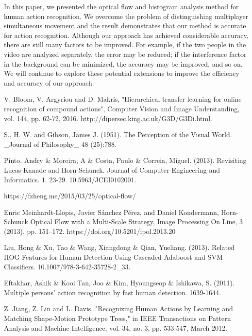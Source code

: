 \documentclass[runningheads,a4paper]{llncs}
\begin{document}
	In this paper, we presented the optical flow and histogram analysis method for human action recognition. We overcome the problem of distinguishing multiplayer simultaneous movement and the result demonstrates that our method is accurate for action recognition. Although our approach has achieved considerable accuracy, there are still many factors to be improved. For example, if the two people in the video are analyzed separately, the error may be reduced; if the interference factor in the background can be minimized, the accuracy may be improved, and so on. We will continue to explore these potential extensions to improve the efficiency and accuracy of our approach.


\begin{thebibliography}{4}

 V. Bloom, V. Argyriou and D. Makris, "Hierarchical transfer learning for online recognition of compound actions", Computer Vision and Image Understanding, vol. 144, pp. 62-72, 2016. http://dipersec.king.ac.uk/G3D/G3Di.html.

 S., H. W. and Gibson, James J. (1951). The Perception of the Visual World. \_Journal of Philosophy\_ 48 (25):788.

 Pinto, Andry \& Moreira, A \& Costa, Paulo \& Correia, Miguel. (2013). Revisiting Lucas-Kanade and Horn-Schunck. Journal of Computer Engineering and Informatics. 1. 23-29. 10.5963/JCEI0102001. 

 https://fzheng.me/2015/03/25/optical-flow/

 Enric Meinhardt-Llopis, Javier Sánchez Pérez, and Daniel Kondermann, Horn-Schunck Optical Flow with a Multi-Scale Strategy, Image Processing On Line, 3 (2013), pp. 151–172. https://doi.org/10.5201/ipol.2013.20



 Liu, Hong \& Xu, Tao \& Wang, Xiangdong \& Qian, Yueliang. (2013). Related HOG Features for Human Detection Using Cascaded Adaboost and SVM Classifiers. 10.1007/978-3-642-35728-2\_33.

 Eftakhar, Ashik \& Kooi Tan, Joo \& Kim, Hyoungseop \& Ishikawa, S. (2011). Multiple persons' action recognition by fast human detection. 1639-1644.

 Z. Jiang, Z. Lin and L. Davis, "Recognizing Human Actions by Learning and Matching Shape-Motion Prototype Trees," in IEEE Transactions on Pattern Analysis and Machine Intelligence, vol. 34, no. 3, pp. 533-547, March 2012.


\end{thebibliography}
\end{document}
